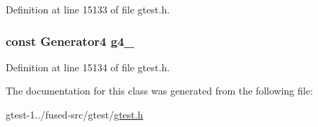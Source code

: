 \-Definition at line 15133 of file gtest.\-h.

\hypertarget{classtesting_1_1internal_1_1CartesianProductHolder4_afdb77af6126bc058715b1304ec0cc727}{
\subsubsection[{g4\-\_\-}]{\setlength{\rightskip}{0pt plus 5cm}const \-Generator4 {\bf g4\-\_\-}}}\label{da/d86/classtesting_1_1internal_1_1CartesianProductHolder4_afdb77af6126bc058715b1304ec0cc727}


\-Definition at line 15134 of file gtest.\-h.



\-The documentation for this class was generated from the following file\-:\begin{DoxyCompactItemize}
\item 
gtest-\/1../fused-\/src/gtest/\hyperlink{fused-src_2gtest_2gtest_8h}{gtest.\-h}\end{DoxyCompactItemize}
